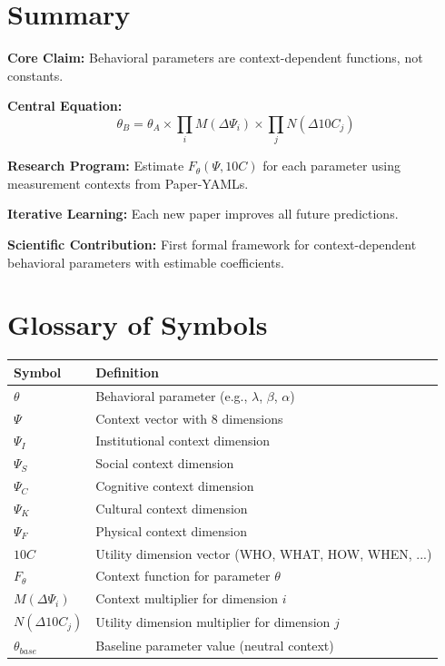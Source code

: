 
\section{Summary}

\begin{tcolorbox}[colback=gray!5!white, colframe=gray!75!black, title=Summary Box]
\textbf{Core Claim:} Behavioral parameters are context-dependent functions, not constants.

\textbf{Central Equation:}
\[
\theta_B = \theta_A \times \prod_i M(\Delta\Psi_i) \times \prod_j N(\Delta 10C_j)
\]

\textbf{Research Program:} Estimate $F_\theta(\Psi, 10C)$ for each parameter using
measurement contexts from Paper-YAMLs.

\textbf{Iterative Learning:} Each new paper improves all future predictions.

\textbf{Scientific Contribution:} First formal framework for context-dependent
behavioral parameters with estimable coefficients.
\end{tcolorbox}



\section{Glossary of Symbols}

\begin{center}
\begin{tabular}{ll}
\toprule
\textbf{Symbol} & \textbf{Definition} \\
\midrule
$\theta$ & Behavioral parameter (e.g., $\lambda$, $\beta$, $\alpha$) \\
$\Psi$ & Context vector with 8 dimensions \\
$\Psi_I$ & Institutional context dimension \\
$\Psi_S$ & Social context dimension \\
$\Psi_C$ & Cognitive context dimension \\
$\Psi_K$ & Cultural context dimension \\
$\Psi_F$ & Physical context dimension \\
$10C$ & Utility dimension vector (WHO, WHAT, HOW, WHEN, ...) \\
$F_\theta$ & Context function for parameter $\theta$ \\
$M(\Delta\Psi_i)$ & Context multiplier for dimension $i$ \\
$N(\Delta 10C_j)$ & Utility dimension multiplier for dimension $j$ \\
$\theta_{base}$ & Baseline parameter value (neutral context) \\
\bottomrule
\end{tabular}
\end{center}

